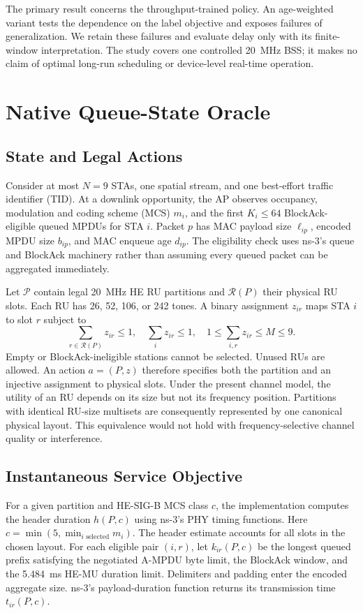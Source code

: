 \documentclass[10pt,journal,onecolumn]{IEEEtran}
\newcommand{\cP}{\mathcal{P}}
\newcommand{\cR}{\mathcal{R}}
\begin{document}
The primary result concerns the throughput-trained policy. An age-weighted
variant tests the dependence on the label objective and exposes failures of
generalization. We retain these failures and evaluate delay only with its
finite-window interpretation. The study covers one controlled 20~MHz BSS;
it makes no claim of optimal long-run scheduling or device-level real-time
operation.

\section{Native Queue-State Oracle}
\label{sec:oracle}
\subsection{State and Legal Actions}
Consider at most $N=9$ STAs, one spatial stream, and one best-effort traffic
identifier (TID). At a downlink opportunity, the AP observes occupancy,
modulation and coding scheme (MCS) $m_i$, and the first $K_i\leq64$
BlockAck-eligible queued MPDUs for STA $i$. Packet $p$ has MAC payload size
$\ell_{ip}$, encoded MPDU size $b_{ip}$, and MAC enqueue age $d_{ip}$.
The eligibility check uses ns-3's queue and BlockAck machinery rather than
assuming every queued packet can be aggregated immediately.

Let $\cP$ contain legal 20~MHz HE RU partitions and $\cR(P)$ their physical
RU slots. Each RU has 26, 52, 106, or 242 tones. A binary assignment $z_{ir}$
maps STA $i$ to slot $r$ subject to
\begin{equation}
 \sum_{r\in\cR(P)}z_{ir}\leq1,\quad \sum_i z_{ir}\leq1,\quad
 1\leq\sum_{i,r}z_{ir}\leq M\leq9.
 \label{eq:legal}
\end{equation}
Empty or BlockAck-ineligible stations cannot be selected. Unused RUs are
allowed. An action $a=(P,z)$ therefore specifies both the partition and
an injective assignment to physical slots. Under the present channel model,
the utility of an RU depends on its size but not its frequency position.
Partitions with identical RU-size multisets are consequently represented by
one canonical physical layout. This equivalence would not hold with
frequency-selective channel quality or interference.

\subsection{Instantaneous Service Objective}
For a given partition and HE-SIG-B MCS class $c$, the implementation computes
the header duration $h(P,c)$ using ns-3's PHY timing functions. Here
$c=\min(5,\min_{i\text{ selected}}m_i)$. The header estimate accounts for all
slots in the chosen layout. For each eligible pair $(i,r)$, let $k_{ir}(P,c)$
be the longest queued prefix satisfying the negotiated A-MPDU byte limit,
the BlockAck window, and the 5.484~ms HE-MU duration limit. Delimiters and
padding enter the encoded aggregate size. ns-3's payload-duration function
returns its transmission time $t_{ir}(P,c)$.
\end{document}
